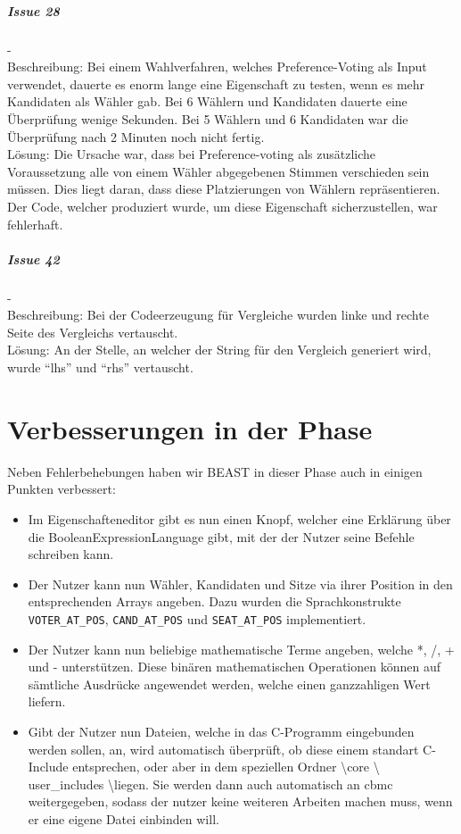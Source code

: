 \documentclass[a4paper]{scrreprt}
\begin{document}
\paragraph{Issue 28}- \\
Beschreibung: Bei einem Wahlverfahren, welches Preference-Voting als Input verwendet, dauerte es enorm lange eine Eigenschaft zu testen, wenn es mehr Kandidaten als Wähler gab. Bei 6 Wählern und Kandidaten dauerte eine Überprüfung wenige Sekunden. Bei 5 Wählern und 6 Kandidaten war die Überprüfung nach 2 Minuten noch nicht fertig.\\
Lösung: Die Ursache war, dass bei Preference-voting als zusätzliche Voraussetzung alle von einem Wähler abgegebenen Stimmen verschieden sein müssen. Dies liegt daran, dass diese Platzierungen von Wählern repräsentieren. Der Code, welcher produziert wurde, um diese Eigenschaft sicherzustellen, war fehlerhaft.

\paragraph{Issue 42}- \\
Beschreibung: Bei der Codeerzeugung für Vergleiche wurden linke und rechte Seite des Vergleichs vertauscht.\\
Lösung: An der Stelle, an welcher der String für den Vergleich generiert wird, wurde "`lhs"' und "`rhs"' vertauscht. 
 


\chapter{Verbesserungen in der Phase}
Neben Fehlerbehebungen haben wir BEAST in dieser Phase auch in einigen Punkten
verbessert:

\begin{itemize}
  \item Im Eigenschafteneditor gibt es nun einen Knopf, welcher eine Erklärung
  über die BooleanExpressionLanguage gibt, mit der der Nutzer seine Befehle
  schreiben kann.
  \item Der Nutzer kann nun Wähler, Kandidaten und Sitze via ihrer Position in den entsprechenden Arrays angeben. Dazu wurden die Sprachkonstrukte \verb!VOTER_AT_POS!, \verb!CAND_AT_POS! und \verb!SEAT_AT_POS! implementiert.
  \item Der Nutzer kann nun beliebige mathematische Terme angeben, welche *, /, + und - unterstützen. Diese binären mathematischen Operationen können auf sämtliche Ausdrücke angewendet werden, welche einen ganzzahligen Wert liefern.
  \item Gibt der Nutzer nun Dateien, welche in das C-Programm eingebunden werden
  sollen, an, wird automatisch überprüft, ob diese einem standart C-Include
  entsprechen, oder aber in dem speziellen Ordner \backslash core \backslash
  user_includes \backslash liegen. Sie werden dann auch automatisch an cbmc
  weitergegeben, sodass der nutzer keine weiteren Arbeiten machen muss, wenn er
  eine eigene Datei einbinden will.
\end{itemize}
\end{document}
